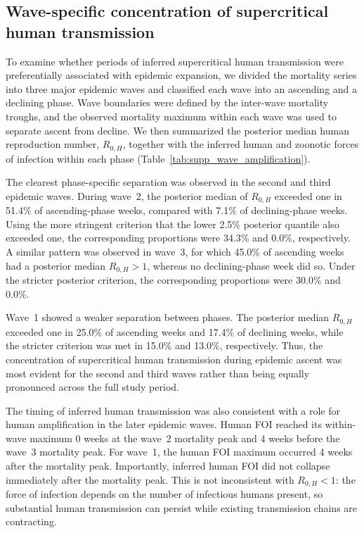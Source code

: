 \subsection{Wave-specific concentration of supercritical human transmission}
\label{sec:supp_wave_amplification}

To examine whether periods of inferred supercritical human transmission were
preferentially associated with epidemic expansion, we divided the mortality
series into three major epidemic waves and classified each wave into an
ascending and a declining phase. Wave boundaries were defined by the
inter-wave mortality troughs, and the observed mortality maximum within each
wave was used to separate ascent from decline. We then summarized the
posterior median human reproduction number, $R_{0,H}$, together with the
inferred human and zoonotic forces of infection within each phase
(Table~\ref{tab:supp_wave_amplification}).

The clearest phase-specific separation was observed in the second and third
epidemic waves. During wave~2, the posterior median of $R_{0,H}$ exceeded
one in 51.4\% of ascending-phase weeks, compared with
7.1\% of declining-phase weeks. Using the more
stringent criterion that the lower 2.5\% posterior quantile also exceeded one,
the corresponding proportions were 34.3\% and
0.0\%, respectively. A similar pattern was
observed in wave~3, for which 45.0\% of ascending
weeks had a posterior median $R_{0,H}>1$, whereas no declining-phase week
did so. Under the stricter posterior criterion, the corresponding proportions
were 30.0\% and
0.0\%.

Wave~1 showed a weaker separation between phases. The posterior median
$R_{0,H}$ exceeded one in 25.0\% of ascending
weeks and 17.4\% of declining weeks, while the
stricter criterion was met in 15.0\% and
13.0\%, respectively. Thus, the concentration
of supercritical human transmission during epidemic ascent was most evident
for the second and third waves rather than being equally pronounced across
the full study period.

The timing of inferred human transmission was also consistent with a role for
human amplification in the later epidemic waves. Human FOI reached its
within-wave maximum 0 weeks
at the wave~2 mortality peak
and 4 weeks
before the wave~3 mortality peak.
For wave~1, the human FOI maximum occurred
4 weeks
after the mortality peak.
Importantly, inferred human FOI did not collapse immediately after the
mortality peak. This is not inconsistent with $R_{0,H}<1$: the force of
infection depends on the number of infectious humans present, so substantial
human transmission can persist while existing transmission chains are
contracting.

